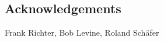 \begin{refsection}


\section*{Acknowledgements}

Frank Richter, Bob Levine, Roland Schäfer



\printbibliography[heading=subbibliography]
\end{refsection}


